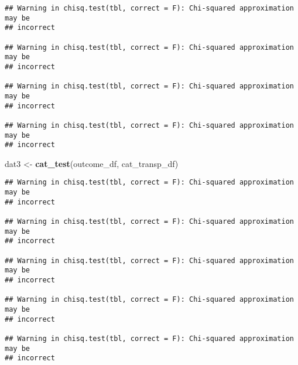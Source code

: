\documentclass[
]{article}
\newenvironment{Shaded}{\begin{snugshade}}{\end{snugshade}}
\newcommand{\FunctionTok}[1]{\textcolor[rgb]{0.13,0.29,0.53}{\textbf{#1}}}
\newcommand{\NormalTok}[1]{#1}
\newcommand{\OtherTok}[1]{\textcolor[rgb]{0.56,0.35,0.01}{#1}}
\begin{document}
\begin{verbatim}
## Warning in chisq.test(tbl, correct = F): Chi-squared approximation may be
## incorrect

## Warning in chisq.test(tbl, correct = F): Chi-squared approximation may be
## incorrect

## Warning in chisq.test(tbl, correct = F): Chi-squared approximation may be
## incorrect

## Warning in chisq.test(tbl, correct = F): Chi-squared approximation may be
## incorrect
\end{verbatim}

\begin{Shaded}
\begin{Highlighting}[]
\NormalTok{dat3 }\OtherTok{\textless{}{-}} \FunctionTok{cat\_test}\NormalTok{(outcome\_df, cat\_transp\_df)}
\end{Highlighting}
\end{Shaded}

\begin{verbatim}
## Warning in chisq.test(tbl, correct = F): Chi-squared approximation may be
## incorrect

## Warning in chisq.test(tbl, correct = F): Chi-squared approximation may be
## incorrect

## Warning in chisq.test(tbl, correct = F): Chi-squared approximation may be
## incorrect

## Warning in chisq.test(tbl, correct = F): Chi-squared approximation may be
## incorrect

## Warning in chisq.test(tbl, correct = F): Chi-squared approximation may be
## incorrect
\end{verbatim}
\end{document}
